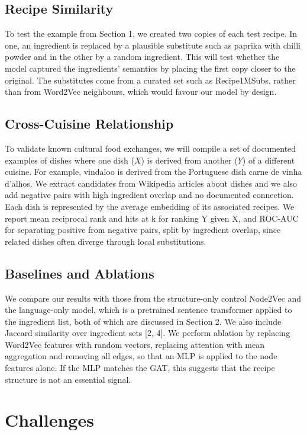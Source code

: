 \documentclass{article}
\begin{document}
\subsection{Recipe Similarity}
To test the example from Section 1, we created two copies of each test recipe. In one, an ingredient is replaced by a plausible substitute such as paprika with chilli powder and in the other by a random ingredient. This will test whether the model captured the ingredients' semantics by placing the first copy closer to the original.  The substitutes come from a curated set such as Recipe1MSubs, rather than from Word2Vec neighbours, which would favour our model by design.

\subsection{Cross-Cuisine Relationship}
To validate known cultural food exchanges, we will compile a set of documented examples of dishes where one dish ($X$) is derived from another ($Y$) of a different cuisine. For example, vindaloo is derived from the Portuguese dish carne de vinha d'alhos. We extract candidates from Wikipedia articles about dishes and we also add negative pairs with high ingredient overlap and no documented connection. Each dish is represented by the average embedding of its associated recipes. We report mean reciprocal rank and hits at k for ranking Y given X, and ROC-AUC for separating positive from negative pairs, split by ingredient overlap, since related dishes often diverge through local substitutions.

\subsection{Baselines and Ablations}
We compare our results with those from the structure-only control Node2Vec and the language-only model, which is a pretrained sentence transformer applied to the ingredient list, both of which are discussed in Section 2. We also include Jaccard similarity over ingredient sets [2, 4]. We perform ablation by replacing Word2Vec features with random vectors, replacing attention with mean aggregation and removing all edges, so that an MLP is applied to the node features alone. If the MLP matches the GAT, this suggests that the recipe structure is not an essential signal.

\section{Challenges}
\end{document}

